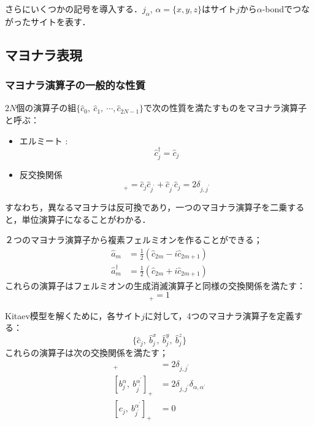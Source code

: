 \documentclass[dvipdfmx,autodetect-engine]{jsarticle}
\begin{document}
さらにいくつかの記号を導入する．$j_\alpha$, $\alpha=\{x,y,z\}$はサイト$j$から$\alpha$-bondでつながったサイトを表す．

\subsection{マヨナラ表現}
\subsubsection{マヨナラ演算子の一般的な性質}
$2N$個の演算子の組$\{\hat{c}_0,\ \hat{c}_1,\ \cdots, \hat{c}_{2N-1}\}$で次の性質を満たすものをマヨナラ演算子と呼ぶ：

\begin{itemize}
      \item エルミート : 
      \begin{equation}
          \hat{c}_j^{\dag} = \hat{c}_j
      \end{equation}
      \item 反交換関係
      \begin{equation}
          [\hat{c}_j,\ \hat{c}_{j^\prime}]_{+}=
          \hat{c}_j\hat{c}_{j^\prime}
          +\hat{c}_{j^\prime}\hat{c}_{j}=2\delta_{j,j^{\prime}}
      \end{equation}
\end{itemize}
すなわち，異なるマヨナラは反可換であり，一つのマヨナラ演算子を二乗すると，単位演算子になることがわかる．


２つのマヨナラ演算子から複素フェルミオンを作ることができる；
\begin{align}
    \hat{a}_m &= \frac{1}{2}
    (\hat{c}_{2m} - i\hat{c}_{2m+1})\\[10pt]
    \hat{a}_m^{\dagger} &= \frac{1}{2}
    (\hat{c}_{2m} + i\hat{c}_{2m+1})
\end{align}
これらの演算子はフェルミオンの生成消滅演算子と同様の交換関係を満たす：
\begin{equation}
    [\hat{a}_m,\ \hat{a}_m^{\dagger}]_+ = 1
\end{equation}


Kitaev模型を解くために，各サイト$j$に対して，4つのマヨナラ演算子を定義する：
\begin{equation}
    \{\hat{c}_j,\ \hat{b}_j^x,\ \hat{b}_j^y,\ \hat{b}_j^z\}
\end{equation}
これらの演算子は次の交換関係を満たす；
\begin{align}
    [c_j,\ c_{j^\prime}]_+ &= 2\delta_{j,j^{\prime}}\\[10pt]
    [b_j^{\alpha},\ b_{j^\prime}^{\alpha^{\prime}}]_+ &= 2\delta_{j,j^{\prime}}\delta_{\alpha,\alpha^{\prime}}\\[10pt]
    [c_j,\ b_{j^\prime}^{\alpha^{\prime}}]_+ &= 0
\end{align}
\end{document}
